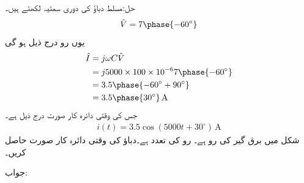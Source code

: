حل:مسلط دباؤ کی دوری سمتیہ لکھتے ہیں۔
\begin{align*}
\hat{V}=7\phase{-60^{\circ}}
\end{align*}
یوں رو درج ذیل ہو گی
\begin{align*}
\hat{I}&=j \omega C \hat{V}\\
&=j 5000 \times 100 \times 10^{-6} 7 \phase{-60^{\circ}}\\
&=3.5 \phase{-60^{\circ}+90^{\circ}}\\
&=3.5\phase{30^{\circ}} \, \si{\ampere}
\end{align*}
جس کی وقتی دائرہ کار صورت درج ذیل ہے۔
\begin{align*}
i(t)=3.5\cos(5000 t+30^{\circ}) \, \si{\ampere}
\end{align*}
شکل  میں  برق گیر کی رو  ہے۔ رو کی تعدد  ہے۔دباؤ کی وقتی دائرہ کار صورت حاصل کریں۔

جواب:

